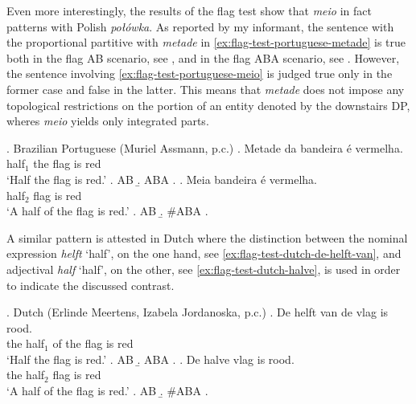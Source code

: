 Even more interestingly, the results of the flag test show that \textit{meio} in fact patterns with Polish \textit{połówka}. As reported by my informant, the sentence with the proportional partitive with \textit{metade} in \ref{ex:flag-test-portuguese-metade} is true both in the flag AB scenario, see , and in the flag ABA scenario, see . However, the sentence involving \ref{ex:flag-test-portuguese-meio} is judged true only in the former case and false in the latter. This means that \textit{metade} does not impose any topological restrictions on the portion of an entity denoted by the downstairs DP, wheres \textit{meio} yields only integrated parts.

		\ex. Brazilian Portuguese (Muriel Assmann, p.c.)\label{ex:flag-test-portuguese}
        \ag. Metade da bandeira é vermelha.\label{ex:flag-test-portuguese-metade}\\
		half$_1$ the flag is red\\
		`Half the flag is red.'
		\a. AB
		\b. ABA
		\z.
		\bg. Meia bandeira é vermelha.\label{ex:flag-test-portuguese-meio}\\
		half$_2$ flag is red\\
		`A half of the flag is red.'
		\a. AB
		\b. \#ABA
		\z.

A similar pattern is attested in Dutch where the distinction between the nominal expression \textit{helft} `half', on the one hand, see \ref{ex:flag-test-dutch-de-helft-van}, and adjectival \textit{half} `half', on the other, see \ref{ex:flag-test-dutch-halve}, is used in order to indicate the discussed contrast.\largerpage

\ex. Dutch (Erlinde Meertens, Izabela Jordanoska, p.c.)\label{ex:flag-test-dutch}
\ag. De helft van de vlag is rood.\label{ex:flag-test-dutch-de-helft-van}\\
		the half$_1$ of the flag is red\\
		`Half the flag is red.'
		\a. AB
		\b. ABA
		\z.
		\bg. De halve vlag is rood.\label{ex:flag-test-dutch-halve}\\
		the half$_2$ flag is red\\
		`A half of the flag is red.'
		\a. AB
		\b. \#ABA
		\z.

